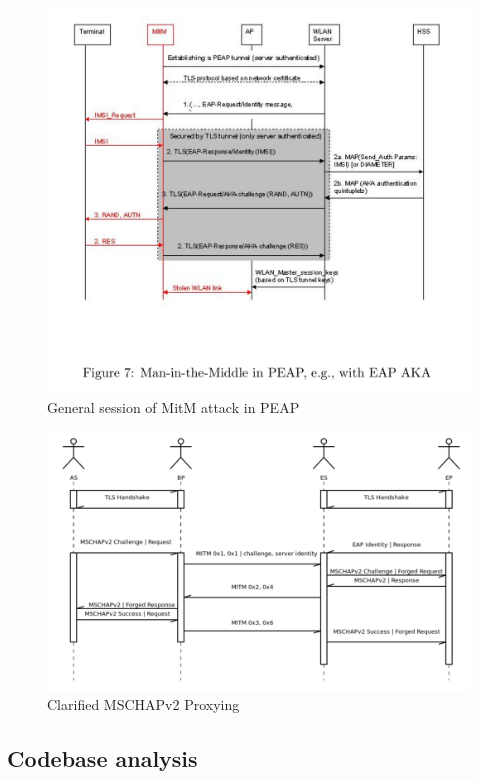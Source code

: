 \documentclass{amsart}
\begin{document}
\begin{figure}
  \centering \includegraphics{res/peap-mitm-general.png}
  \caption{General session of MitM attack in PEAP}
\end{figure}

\begin{figure}
  \centering \includegraphics[scale=0.5]{res/clarified-mschapv2-mitm-in-peap.png}
  \caption{Clarified MSCHAPv2 Proxying}
\end{figure}

\subsection{Codebase analysis}
\end{document}
